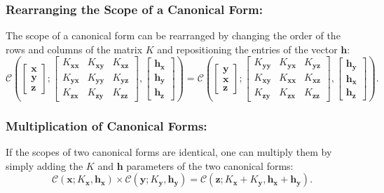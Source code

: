 \documentclass[12pt,oneside,openany,a4paper, %
afrikaans,english,
]{memoir}
\numberwithin{equation}{chapter}
\begin{document}
{\subsubsection{Rearranging the Scope of a Canonical Form:}
The scope of a canonical form can be rearranged by changing the order of the rows and columns of the matrix $K$ and repositioning the entries of the vector $\bm{h}$:
\begin{equation}
\mathcal{C}\left(
\begin{bmatrix}
\bm{x}\\
\bm{y}\\
\bm{z}
\end{bmatrix};
\begin{bmatrix}
K_{\bm{xx}} & K_{\bm{xy}} & K_{\bm{xz}}\\
K_{\bm{yx}} & K_{\bm{yy}} & K_{\bm{yz}}\\
K_{\bm{zx}} & K_{\bm{zy}} & K_{\bm{zz}}
\end{bmatrix},
\begin{bmatrix}
\bm{h_x}\\
\bm{h_y}\\
\bm{h_z}
\end{bmatrix}
\right)
=
\mathcal{C}\left(
\begin{bmatrix}
\bm{y}\\
\bm{x}\\
\bm{z}
\end{bmatrix};
\begin{bmatrix}
K_{\bm{yy}} & K_{\bm{yx}} & K_{\bm{yz}}\\
K_{\bm{xy}} & K_{\bm{xx}} & K_{\bm{xz}}\\
K_{\bm{zy}} & K_{\bm{zx}} & K_{\bm{zz}}
\end{bmatrix},
\begin{bmatrix}
\bm{h_y}\\
\bm{h_x}\\
\bm{h_z}
\end{bmatrix}
\right).
\end{equation}
\subsubsection{Multiplication of Canonical Forms:}
If the scopes of two canonical forms are identical, one can multiply them by simply adding the $K$ and $\bm{h}$ parameters of the two canonical forms:
\begin{equation}\label{eq:10}
\mathcal{C} (\bm{x}; K_{\bm{x}},\bm{h_x}) \times \mathcal{C} (\bm{y}; K_{\bm{y}},\bm{h_y})= \mathcal{C} (\bm{z};K_{\bm{x}} + K_{\bm{y}}, \bm{h_x} + \bm{h_y}).
\end{equation}
}
\end{document}
